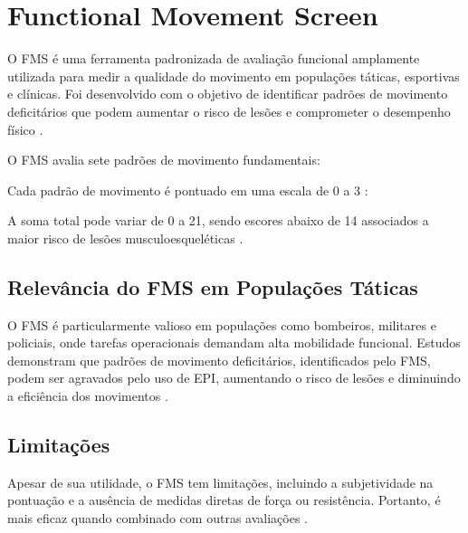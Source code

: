 \chapter{Functional Movement Screen}

O \acrfull{FMS} é uma ferramenta padronizada de avaliação funcional amplamente utilizada para medir a qualidade do movimento
 em populações táticas, esportivas e clínicas. Foi desenvolvido com o objetivo de identificar padrões de movimento deficitários que podem aumentar
  o risco de lesões e comprometer o desempenho físico \cite{cook2006pre}.

\tab O \acrshort{FMS} avalia sete padrões de movimento fundamentais:


\tab Cada padrão de movimento é pontuado em uma escala de 0 a 3 \cite{cook2006pre, teyhen2012functional}: 

\tab A soma total pode variar de 0 a 21, sendo escores abaixo de 14 associados a maior risco de lesões musculoesqueléticas \cite{bock2015use}.

\section{Relevância do \acrshort{FMS} em Populações Táticas}
O \acrshort{FMS} é particularmente valioso em populações como bombeiros, militares e policiais, onde tarefas operacionais demandam alta mobilidade funcional.
 Estudos demonstram que padrões de movimento deficitários, identificados pelo \acrshort{FMS}, podem ser agravados pelo uso de \acrshort{EPI}, aumentando o risco
  de lesões e diminuindo a eficiência dos movimentos \cite{orr2019impact}. 

\section{Limitações}
Apesar de sua utilidade, o \acrshort{FMS} tem limitações, incluindo a subjetividade na pontuação e a ausência de medidas diretas de força ou resistência.
 Portanto, é mais eficaz quando combinado com outras avaliações \cite{gribble2013intrarater}.